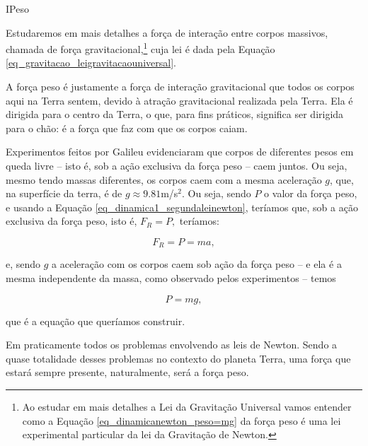 \vspace{0.3cm}









\begin{secnivel}[Peso]{I}{Peso}
  

\end{secnivel}







Estudaremos em mais detalhes a força de interação entre corpos massivos, chamada de força gravitacional,\footnote{Ao estudar em mais detalhes a Lei da Gravitação Universal vamos entender como a Equação \eqref{eq_dinamicanewton_peso=mg} da força peso é uma lei experimental particular da lei da Gravitação de Newton.} cuja lei é dada pela Equação \eqref{eq_gravitacao_leigravitacaouniversal}. 

A força peso é justamente a força de interação gravitacional que todos os corpos aqui na Terra sentem, devido à atração gravitacional realizada pela Terra. Ela é dirigida para o centro da Terra, o que, para fins práticos, significa ser dirigida para o chão: é a força que faz com que os corpos caiam.

Experimentos feitos por Galileu evidenciaram que corpos de diferentes pesos em queda livre -- isto é, sob a ação exclusiva da força peso -- caem juntos. Ou seja, mesmo tendo massas diferentes, os corpos caem com a mesma aceleração $g$, que, na superfície da terra, é de $g \approx 9.81 $m/s$^2$. Ou seja, sendo $P$ o valor da força peso, e usando a Equação \eqref{eq_dinamica1_segundaleinewton}, teríamos que, sob a ação exclusiva da força peso, isto é, $F_R =P,$ teríamos:

$$ F_R = P = ma,$$


\noindent e, sendo $g$ a aceleração com os corpos caem sob ação da força peso -- e ela é a mesma independente da massa, como observado pelos experimentos -- temos

$$ P = mg,$$

\noindent que é a equação que queríamos construir.



Em praticamente todos os problemas envolvendo as leis de Newton. Sendo a quase totalidade desses problemas no contexto do planeta Terra, uma força que estará sempre presente, naturalmente, será a força peso. 

